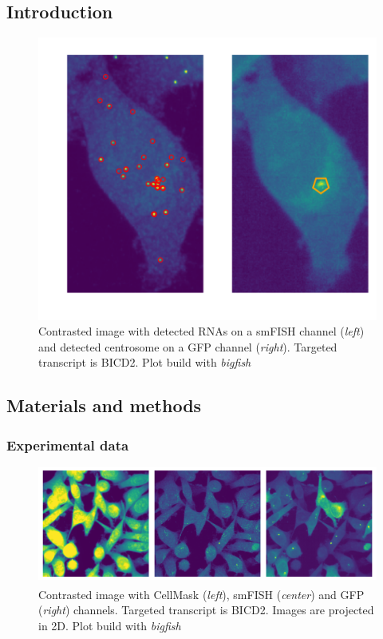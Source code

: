 \subsection{Introduction}
\label{subsec:introduction_centrosomal}

\begin{figure}[h]
    \centering
    \includegraphics[width=\textwidth]{figures/chapter5/centrosomes}
    \caption{Contrasted image with detected RNAs on a smFISH channel (\textit{left}) and detected centrosome on a GFP channel (\textit{right}).
	Targeted transcript is BICD2.
	Plot build with \emph{bigfish}}
    \label{fig:centrosomes}
\end{figure}

\subsection{Materials and methods}
\label{subsec:materials_centrosomal}

\subsubsection{Experimental data}

\begin{figure}[h]
    \centering
    \includegraphics[width=\textwidth]{figures/chapter5/FoV_BICD2}
    \caption{Contrasted image with CellMask\textsuperscript{\texttrademark} (\textit{left}), smFISH (\textit{center}) and GFP (\textit{right}) channels.
	Targeted transcript is BICD2.
	Images are projected in 2D.
	Plot build with \emph{bigfish}}
    \label{fig:fov_adham}
\end{figure}

